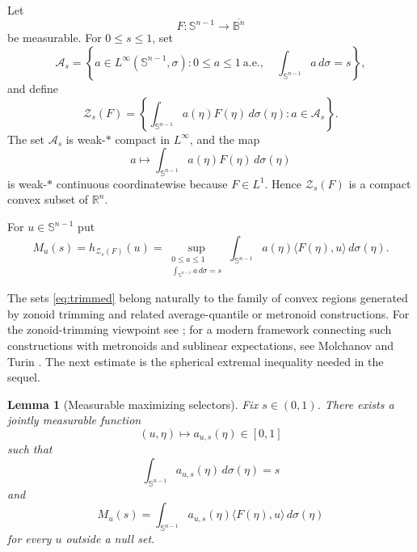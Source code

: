 \documentclass[11pt,reqno]{amsart}
\newtheorem{lemma}[theorem]{Lemma}
\theoremstyle{remark}
\begin{document}
Let
\[
 F:\mathbb S^{n-1}\longrightarrow\overline{\mathbb B^n}
\]
be measurable.  For $0\le s\le1$, set
\[
 \mathcal A_s
 =
 \left\{
 a\in L^\infty(\mathbb S^{n-1},\sigma):
 0\le a\le1\ \text{a.e.},\quad
 \int_{\mathbb S^{n-1}}a\,d\sigma=s
 \right\},
\]
and define
\begin{equation}\label{eq:trimmed}
 \mathcal Z_s(F)
 =
 \left\{
 \int_{\mathbb S^{n-1}}a(\eta)F(\eta)\,d\sigma(\eta):
 a\in\mathcal A_s
 \right\}.
\end{equation}
The set $\mathcal A_s$ is weak-$*$ compact in $L^\infty$, and the map
\[
 a\longmapsto\int_{\mathbb S^{n-1}}a(\eta)F(\eta)\,d\sigma(\eta)
\]
is weak-$*$ continuous coordinatewise because $F\in L^1$.  Hence
$\mathcal Z_s(F)$ is a compact convex subset of $\mathbb R^n$.

For $u\in\mathbb S^{n-1}$ put
\begin{equation}\label{eq:Mu}
 M_u(s)=h_{\mathcal Z_s(F)}(u)
 =
 \sup_{\substack{0\le a\le1\\\int_{\mathbb S^{n-1}} a\,d\sigma=s}}
 \int_{\mathbb S^{n-1}}
 a(\eta)\langle F(\eta),u\rangle\,d\sigma(\eta).
\end{equation}

The sets \eqref{eq:trimmed} belong naturally to the family of convex
regions generated by zonoid trimming and related average-quantile or
metronoid constructions.  For the zonoid-trimming viewpoint see
\cite{KoshevoyMosler1997,KoshevoyMosler1998,Mosler}; for a modern framework
connecting such constructions with metronoids and sublinear expectations,
see Molchanov and Turin \cite{MolchanovTurin}.  The next estimate is the
spherical extremal inequality needed in the sequel.

\begin{lemma}[Measurable maximizing selectors]\label{lem:quantile-selector}
Fix $s\in(0,1)$.  There exists a jointly measurable function
\[
 (u,\eta)\longmapsto a_{u,s}(\eta)\in[0,1]
\]
such that
\[
 \int_{\mathbb S^{n-1}} a_{u,s}(\eta)\,d\sigma(\eta)=s
\]
and
\[
 M_u(s)
 =
 \int_{\mathbb S^{n-1}} a_{u,s}(\eta)\langle F(\eta),u\rangle\,d\sigma(\eta)
\]
for every $u$ outside a null set.
\end{lemma}
\end{document}
